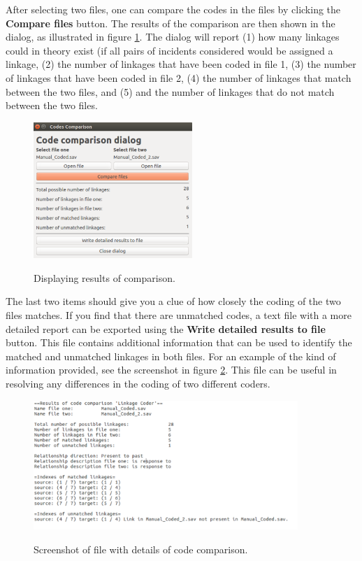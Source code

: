 \documentclass{memoir}
\begin{document}
After selecting two files, one can compare the codes in the files by clicking the \textbf{Compare files} button. The results of the comparison are then shown in the dialog, as illustrated in figure \ref{fig:comparedcodes}. The dialog will report (1) how many linkages could in theory exist (if all pairs of incidents considered would be assigned a linkage, (2) the number of linkages that have been coded in file 1, (3) the number of linkages that have been coded in file 2, (4) the number of linkages that match between the two files, and (5) and the number of linkages that do not match between the two files.

\begin{figure}[h!]
  \centering
  \caption{Displaying results of comparison.}
  \includegraphics[width=60mm]{Screenshot_14.pdf}
  \label{fig:comparedcodes}
\end{figure}

The last two items should give you a clue of how closely the coding of the two files matches. If you find that there are unmatched codes, a text file with a more detailed report can be exported using the \textbf{Write detailed results to file} button. This file contains additional information that can be used to identify the matched and unmatched linkages in both files. For an example of the kind of information provided, see the screenshot in figure \ref{fig:screenshotresults}. This file can be useful in resolving any differences in the coding of two different coders. 

\begin{figure}[h!]
  \centering
  \caption{Screenshot of file with details of code comparison.}
  \includegraphics[width=100mm]{Screenshot_16.pdf}
  \label{fig:screenshotresults}
\end{figure}
\end{document}
